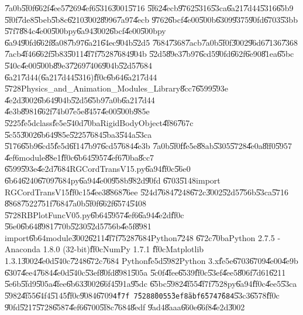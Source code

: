 \U{7a0b}\U{5f0f}\U{662f}\U{4ee5}\U{7269}\U{4ef6}\U{5316}\U{3001}\U{5716}%
\U{5f62}\U{4ecb}\U{9762}\U{5316}\U{53ca}\U{6a21}\U{7d44}\U{5316}\U{65b9}%
\U{5f0f}\U{7de8}\U{5beb}\U{5b8c}\U{6210}\U{3002}\U{8996}\U{7a97}\U{4ecb}%
\U{9762}\U{6bcf}\U{4e00}\U{500b}\U{6309}\U{9375}\U{90fd}\U{6703}\U{53bb}%
\U{57f7}\U{884c}\U{4e00}\U{500b}py\U{6a94}\U{3002}\U{6bcf}\U{4e00}\U{500b}py%
\U{6a94}\U{90fd}\U{662f}\U{8a08}\U{7b97}\U{6a21}\U{64ec}\U{904b}\U{52d5}%
\U{7684}\U{7368}\U{7acb}\U{7a0b}\U{5f0f}\U{3002}\U{96d6}\U{7136}\U{7368}%
\U{7acb}\U{4f46}\U{662f}\U{5b83}\U{5011}\U{4f7f}\U{7528}\U{7684}\U{904b}%
\U{52d5}\U{89e3}\U{7b97}\U{6cd5}\U{90fd}\U{662f}\U{6e90}\U{81ea}\U{65bc}%
\U{540c}\U{4e00}\U{500b}\U{89e3}\U{7269}\U{7406}\U{904b}\U{52d5}\U{7684}%
\U{6a21}\U{7d44}(\U{6a21}\U{7d44}\U{5316})\U{ff0c}\U{6b64}\U{6a21}\U{7d44}%
\U{5728}Physics\_and\_Animation\_Modules\_Library\U{8cc7}\U{6599}\U{593e}%
\U{4e2d}\U{3002}\U{6b64}\U{904b}\U{52d5}\U{65b9}\U{7a0b}\U{6a21}\U{7d44}%
\U{4e3b}\U{8981}\U{662f}\U{74b0}\U{7e5e}\U{8457}\U{4e00}\U{500b}\U{985e}%
\U{5225}\U{fe5d}class\U{fe5e}\U{540d}\U{70ba}RigidBodyObject\U{4f86}\U{767c}%
\U{5c55}\U{3002}\U{6b64}\U{985e}\U{5225}\U{7684}\U{5ba3}\U{544a}\U{53ca}%
\U{5176}\U{65b9}\U{6cd5}\U{fe5d}\U{6f14}\U{7b97}\U{6cd5}\U{7684}\U{4e3b}%
\U{7a0b}\U{5f0f}\U{fe5e}\U{88ab}\U{5305}\U{5728}\U{4e0a}\U{8ff0}\U{5957}%
\U{4ef6}module\U{88e1}\U{ff0c}\U{6b64}\U{5957}\U{4ef6}\U{70ba}\U{8cc7}%
\U{6599}\U{593e}\U{4e2d}\U{7684}RGCordTransV15.py\U{6a94}\U{ff0c}\U{56e0}%
\U{6b64}\U{6240}\U{6709}\U{7684}py\U{6a94}\U{4e00}\U{958b}\U{982d}\U{90fd}%
\U{6703}\U{5148}import RGCordTransV15\U{ff0c}15\U{4ee3}\U{8868}\U{76ee}%
\U{524d}\U{7684}\U{7248}\U{672c}\U{3002}\U{52d5}\U{756b}\U{53ca}\U{5716}%
\U{8868}\U{7522}\U{751f}\U{7684}\U{7a0b}\U{5f0f}\U{662f}\U{6574}\U{5408}%
\U{5728}RBPlotFuncV05.py\U{6b64}\U{5957}\U{4ef6}\U{6a94}\U{4e2d}\U{ff0c}%
\U{56e0}\U{6b64}\U{8981}\U{770b}\U{5230}\U{52d5}\U{756b}\U{4e5f}\U{8981}%
import\U{6b64}module\U{3002}\U{6211}\U{4f7f}\U{7528}\U{7684}Python\U{7248}%
\U{672c}\U{70ba}Python 2.7.5 - Anaconda 1.8.0 (32-bit)\U{ff0c}NumPy 1.7.1%
\U{ff0c}Matplotlib 1.3.1\U{3002}\U{4e0d}\U{540c}\U{7248}\U{672c}\U{7684}%
Python\U{fe5d}\U{5982}Python 3.x\U{fe5e}\U{6703}\U{6709}\U{4e00}\U{4e9b}%
\U{6307}\U{4ee4}\U{7684}\U{4e0d}\U{540c}\U{53ef}\U{80fd}\U{8981}\U{505a}%
\U{5c0f}\U{4fee}\U{6539}\U{ff0c}\U{53ef}\U{4ee5}\U{806f}\U{7d61}\U{6211}%
\U{5e6b}\U{5fd9}\U{505a}\U{4fee}\U{6b63}\U{3002}\U{66f4}\U{591a}\U{95dc}%
\U{65bc}\U{5982}\U{4f55}\U{4f7f}\U{7528}py\U{6a94}\U{ff0c}\U{4ee5}\U{53ca}%
\U{5982}\U{4f55}\U{64f4}\U{5145}\U{ff0c}\U{9084}\U{6709}\texttt{\U{4f7f}%
\U{7528}\U{8005}\U{53ef}\U{8abf}\U{6574}\U{7684}}\U{53c3}\U{6578}\U{ff0c}%
\U{90fd}\U{5217}\U{5728}\U{6587}\U{4ef6}\U{6700}\U{5f8c}\U{7684}\U{8edf}%
\U{9ad4}\U{8aaa}\U{660e}\U{66f8}\U{4e2d}\U{3002}

